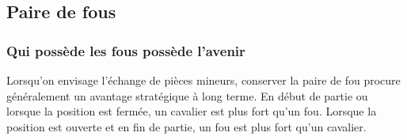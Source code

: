\subsection{Paire de fous}
\subsubsection{Qui possède les fous possède l'avenir}
Lorsqu'on envisage l'échange de pièces mineurs, conserver la paire de fou procure généralement un avantage stratégique à long terme. En début de partie ou lorsque la position est fermée, un cavalier est plus fort qu'un fou. Lorsque la position est ouverte et en fin de partie, un fou est plus fort qu'un cavalier. 
%




